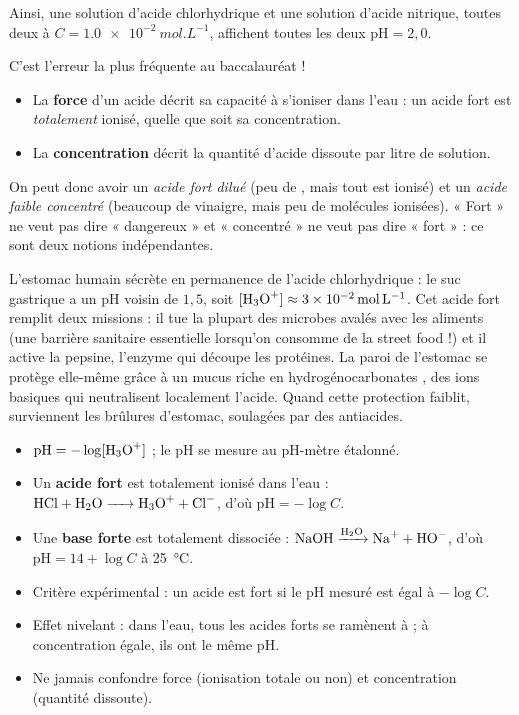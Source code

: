 \documentclass[11pt]{article}
\begin{document}
Ainsi, une solution d'acide chlorhydrique et une solution d'acide nitrique, toutes deux à $C = \SI{1,0e-2}{mol.L^{-1}}$, affichent toutes les deux $\mathrm{pH} = 2,0$.

\begin{attention}
C'est l'erreur la plus fréquente au baccalauréat !
\begin{itemize}
\item La \textbf{force} d'un acide décrit sa capacité à s'ioniser dans l'eau : un acide fort est \emph{totalement} ionisé, quelle que soit sa concentration.
\item La \textbf{concentration} décrit la quantité d'acide dissoute par litre de solution.
\end{itemize}
On peut donc avoir un \emph{acide fort dilué} (peu de , mais tout est ionisé) et un \emph{acide faible concentré} (beaucoup de vinaigre, mais peu de molécules ionisées). « Fort » ne veut pas dire « dangereux » et « concentré » ne veut pas dire « fort » : ce sont deux notions indépendantes.
\end{attention}

\begin{savaistu}
L'estomac humain sécrète en permanence de l'acide chlorhydrique : le suc gastrique a un pH voisin de $1,5$, soit $[\ce{H3O+}] \approx \SI{3e-2}{mol.L^{-1}}$. Cet acide fort remplit deux missions : il tue la plupart des microbes avalés avec les aliments (une barrière sanitaire essentielle lorsqu'on consomme de la street food !) et il active la pepsine, l'enzyme qui découpe les protéines. La paroi de l'estomac se protège elle-même grâce à un mucus riche en hydrogénocarbonates , des ions basiques qui neutralisent localement l'acide. Quand cette protection faiblit, surviennent les brûlures d'estomac, soulagées par des antiacides.
\end{savaistu}

\begin{aretenir}
\begin{itemize}
\item $\mathrm{pH} = -\log[\ce{H3O+}]$ ; le pH se mesure au pH-mètre étalonné.
\item Un \textbf{acide fort} est totalement ionisé dans l'eau : $\ce{HCl + H2O -> H3O+ + Cl-}$, d'où $\mathrm{pH} = -\log C$.
\item Une \textbf{base forte} est totalement dissociée : $\ce{NaOH ->[H2O] Na+ + HO-}$, d'où $\mathrm{pH} = 14 + \log C$ à \SI{25}{\celsius}.
\item Critère expérimental : un acide est fort si le pH mesuré est égal à $-\log C$.
\item Effet nivelant : dans l'eau, tous les acides forts se ramènent à  ; à concentration égale, ils ont le même pH.
\item Ne jamais confondre force (ionisation totale ou non) et concentration (quantité dissoute).
\end{itemize}
\end{aretenir}
\end{document}
